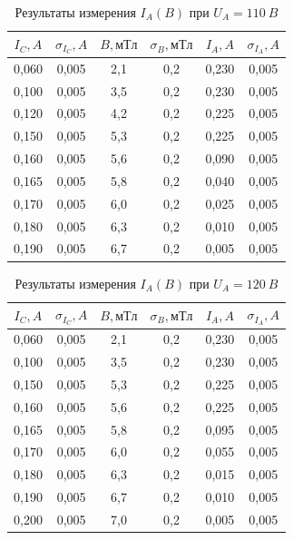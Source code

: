 \documentclass[a4paper, 12pt]{article}
\begin{document}
\begin{table}[h!]
\begin{center}
\begin{tabular}{|c|c|c|c|c|c|}
\hline
$I_C, A$ & $\sigma_{I_C}, A$ & $B, мТл$ & $\sigma_{B}, мТл$ & $I_A, A$ & $\sigma_{I_A}, A$ \\ \hline
0,060 & 0,005  & 2,1    & 0,2     & 0,230 & 0,005  \\ \hline
0,100 & 0,005  & 3,5    & 0,2     & 0,230 & 0,005  \\ \hline
0,120 & 0,005  & 4,2    & 0,2     & 0,225 & 0,005  \\ \hline
0,150 & 0,005  & 5,3    & 0,2     & 0,225 & 0,005  \\ \hline
0,160 & 0,005  & 5,6    & 0,2     & 0,090 & 0,005  \\ \hline
0,165 & 0,005  & 5,8    & 0,2     & 0,040 & 0,005  \\ \hline
0,170 & 0,005  & 6,0    & 0,2     & 0,025 & 0,005  \\ \hline
0,180 & 0,005  & 6,3    & 0,2     & 0,010 & 0,005  \\ \hline
0,190 & 0,005  & 6,7    & 0,2     & 0,005 & 0,005  \\ \hline
\end{tabular}
\end{center}
\caption{Результаты измерения $I_A(B)$ при $U_A = 110~B$}
\label{tab9}
\end{table}

\begin{table}[h!]
\begin{center}
\begin{tabular}{|c|c|c|c|c|c|}
\hline
$I_C, A$ & $\sigma_{I_C}, A$ & $B, мТл$ & $\sigma_{B}, мТл$ & $I_A, A$ & $\sigma_{I_A}, A$ \\ \hline
0,060 & 0,005 & 2,1 & 0,2 & 0,230 & 0,005 \\ \hline
0,100 & 0,005 & 3,5 & 0,2 & 0,230 & 0,005 \\ \hline
0,150 & 0,005 & 5,3 & 0,2 & 0,225 & 0,005 \\ \hline
0,160 & 0,005 & 5,6 & 0,2 & 0,225 & 0,005 \\ \hline
0,165 & 0,005 & 5,8 & 0,2 & 0,095 & 0,005 \\ \hline
0,170 & 0,005 & 6,0 & 0,2 & 0,055 & 0,005 \\ \hline
0,180 & 0,005 & 6,3 & 0,2 & 0,015 & 0,005 \\ \hline
0,190 & 0,005 & 6,7 & 0,2 & 0,010 & 0,005 \\ \hline
0,200 & 0,005 & 7,0 & 0,2 & 0,005 & 0,005 \\ \hline
\end{tabular}
\end{center}
\caption{Результаты измерения $I_A(B)$ при $U_A = 120~B$}
\label{tab10}
\end{table}
\end{document}
